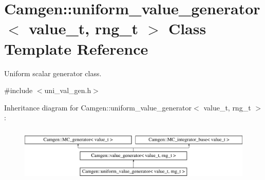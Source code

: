 \hypertarget{a00570}{}\section{Camgen\+:\+:uniform\+\_\+value\+\_\+generator$<$ value\+\_\+t, rng\+\_\+t $>$ Class Template Reference}
\label{a00570}


Uniform scalar generator class.  




{\ttfamily \#include $<$uni\+\_\+val\+\_\+gen.\+h$>$}

Inheritance diagram for Camgen\+:\+:uniform\+\_\+value\+\_\+generator$<$ value\+\_\+t, rng\+\_\+t $>$\+:\begin{figure}[H]
\begin{center}
\leavevmode
\includegraphics[height=2.649842cm]{a00570}
\end{center}
\end{figure}
